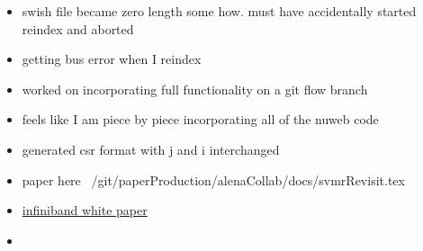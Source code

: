 \documentclass[hyperref]{labbook}
\begin{document}
 \begin{itemize}
 \item swish file became zero length some how. must have accidentally started reindex and aborted
 \item getting bus error when I reindex
 \end{itemize}









\begin{itemize}
\item worked on incorporating full functionality on a git flow branch
\item feels like I am piece by piece incorporating all of the nuweb code
\item generated csr format with j and i interchanged 
\end{itemize}


 \begin{itemize}
 \item paper here ~/git/paperProduction/alenaCollab/docs/svmrRevisit.tex
 \end{itemize}



 \begin{itemize}
 \item \href{http://www.mellanox.com/pdf/whitepapers/Intro_to_IB_for_End_Users.pdf}{infiniband white paper}
 \end{itemize}

 \begin{itemize}
 \item 
 \end{itemize}
\end{document}

